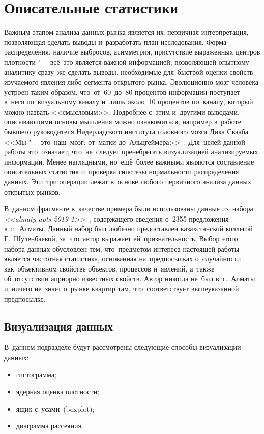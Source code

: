 \documentclass[]{scrartcl}
\begin{document}
\section{Описательные статистики}
Важным этапом анализа данных рынка является их~первичная интерпретация, позволяющая сделать выводы и~разработать план исследования. Форма распределения, наличие выбросов, асимметрия, присутствие выраженных центров плотности "--- всё~это является важной информацией, позволяющей
опытному аналитику сразу~же сделать выводы, необходимые для~быстрой оценки свойств изучаемого явления либо сегмента открытого рынка.  Эволюционно мозг человека устроен таким
образом, что~от~60~до~80 процентов информации поступает в~него по~визуальному каналу и~лишь
около~10 процентов по~каналу, который можно назвать <<смысловым>>. Подробнее с~этим и~другими
выводами, описывающими основы мышления  можно ознакомиться, например в~работе бывшего руководителя Нидерладского института головного мозга Дика Свааба <<Мы "--- это~наш~мозг: от~матки до~Альцгеймера>>~\cite{Swaab:mozg}. Для~целей данной работы это~означает, что~не~следует пренебрегать визуализацией анализируемых информации. Менее наглядными, но~ещё~более важными являются составление описательных статистик и~проверка гипотезы нормальности распределения данных. Эти~три операции лежат в~основе любого первичного анализа данных открытых рынков.
\par В~данном фрагменте в~качестве примера были использованы данные из~набора \emph{<<almaty-apts-2019-1>>}~\cite{ds:almaty-apts-2019-1}, содержащего сведения о~2355 предложения в~г.~Алматы. Данный набор был любезно предоставлен казахстанской коллегой Г.~Шуленбаевой, за~что~автор выражает ей~признательность. Выбор этого набора данных обусловлен тем, что~предметом интереса настоящей работы является частотная статистика, основанная на~предпосылках о~случайности как~объективном свойстве объектов, процессов и~явлений, а~также об~отсутствии априорно известных свойств. Автор никогда не~был в~г.~Алматы и~ничего не~знает о~рынке квартир там, что~соответствует вышеуказанной предпосылке. 
\subsection{Визуализация данных}
В~данном подразделе будут рассмотрены следующие способы визуализации данных:
	\begin{itemize}
		\item гистограмма;
		\item ядерная оценка плотности;
		\item ящик с~усами~(boxplot);
		\item диаграмма рассеяния.
	\end{itemize}
\end{document}
